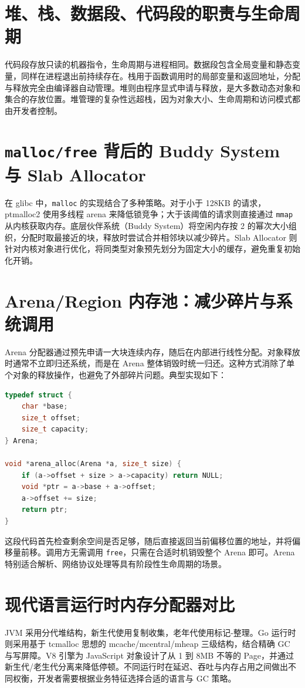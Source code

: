 \chapter{堆、栈、数据段、代码段的职责与生命周期}
代码段存放只读的机器指令，生命周期与进程相同。数据段包含全局变量和静态变量，同样在进程退出前持续存在。栈用于函数调用时的局部变量和返回地址，分配与释放完全由编译器自动管理。堆则由程序显式申请与释放，是大多数动态对象和集合的存放位置。堆管理的复杂性远超栈，因为对象大小、生命周期和访问模式都由开发者控制。\par
\chapter{\texttt{malloc/free} 背后的 Buddy System 与 Slab Allocator}
在 glibc 中，\texttt{malloc} 的实现结合了多种策略。对于小于 128KB 的请求，ptmalloc2 使用多线程 arena 来降低锁竞争；大于该阈值的请求则直接通过 \texttt{mmap} 从内核获取内存。底层伙伴系统（Buddy System）将空闲内存按 2 的幂次大小组织，分配时取最接近的块，释放时尝试合并相邻块以减少碎片。Slab Allocator 则针对内核对象进行优化，将同类型对象预先划分为固定大小的缓存，避免重复初始化开销。\par
\chapter{Arena/Region 内存池：减少碎片与系统调用}
Arena 分配器通过预先申请一大块连续内存，随后在内部进行线性分配。对象释放时通常不立即归还系统，而是在 Arena 整体销毁时统一归还。这种方式消除了单个对象的释放操作，也避免了外部碎片问题。典型实现如下：\par
\begin{lstlisting}[language=c]
typedef struct {
    char *base;
    size_t offset;
    size_t capacity;
} Arena;

void *arena_alloc(Arena *a, size_t size) {
    if (a->offset + size > a->capacity) return NULL;
    void *ptr = a->base + a->offset;
    a->offset += size;
    return ptr;
}
\end{lstlisting}
这段代码首先检查剩余空间是否足够，随后直接返回当前偏移位置的地址，并将偏移量前移。调用方无需调用 \texttt{free}，只需在合适时机销毁整个 Arena 即可。Arena 特别适合解析、网络协议处理等具有阶段性生命周期的场景。\par
\chapter{现代语言运行时内存分配器对比}
JVM 采用分代堆结构，新生代使用复制收集，老年代使用标记-整理。Go 运行时则采用基于 tcmalloc 思想的 mcache/mcentral/mheap 三级结构，结合精确 GC 与写屏障。V8 引擎为 JavaScript 对象设计了从 1 到 8MB 不等的 Page，并通过新生代/老生代分离来降低停顿。不同运行时在延迟、吞吐与内存占用之间做出不同权衡，开发者需要根据业务特征选择合适的语言与 GC 策略。\par
